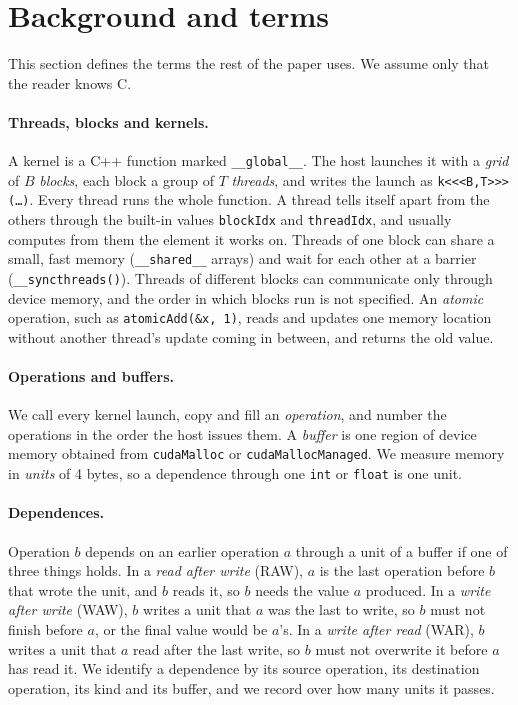 \documentclass[11pt]{article}
\newcommand{\term}[1]{\emph{#1}}
\newcommand{\code}[1]{\texttt{#1}}
\begin{document}
\section{Background and terms}
\label{sec:background}

This section defines the terms the rest of the paper uses. We assume only that the reader knows C.

\paragraph{Threads, blocks and kernels.} A kernel is a C++ function marked \code{\_\_global\_\_}. The host launches
it with a \term{grid} of $B$ \term{blocks}, each block a group of $T$ \term{threads}, and writes the launch as
\code{k<{}<{}<B,T>{}>{}>(\ldots)}. Every thread runs the whole function. A thread tells itself apart from the others through
the built-in values \code{blockIdx} and \code{threadIdx}, and usually computes from them the element it works on.
Threads of one block can share a small, fast memory (\code{\_\_shared\_\_} arrays) and wait for each other at a
barrier (\code{\_\_syncthreads()}). Threads of different blocks can communicate only through device memory, and
the order in which blocks run is not specified. An \term{atomic} operation, such as \code{atomicAdd(\&x, 1)},
reads and updates one memory location without another thread's update coming in between, and returns the old
value.

\paragraph{Operations and buffers.} We call every kernel launch, copy and fill an \term{operation}, and number
the operations in the order the host issues them. A \term{buffer} is one region of device memory obtained from
\code{cudaMalloc} or \code{cudaMallocManaged}. We measure memory in \term{units} of 4 bytes, so a dependence
through one \code{int} or \code{float} is one unit.

\paragraph{Dependences.} Operation $b$ depends on an earlier operation $a$ through a unit of a buffer if one of
three things holds. In a \term{read after write} (RAW), $a$ is the last operation before $b$ that wrote the unit,
and $b$ reads it, so $b$ needs the value $a$ produced. In a \term{write after write} (WAW), $b$ writes a unit that
$a$ was the last to write, so $b$ must not finish before $a$, or the final value would be $a$'s. In a \term{write
after read} (WAR), $b$ writes a unit that $a$ read after the last write, so $b$ must not overwrite it before $a$
has read it. We identify a dependence by its source operation, its destination operation, its kind and its buffer,
and we record over how many units it passes.
\end{document}
